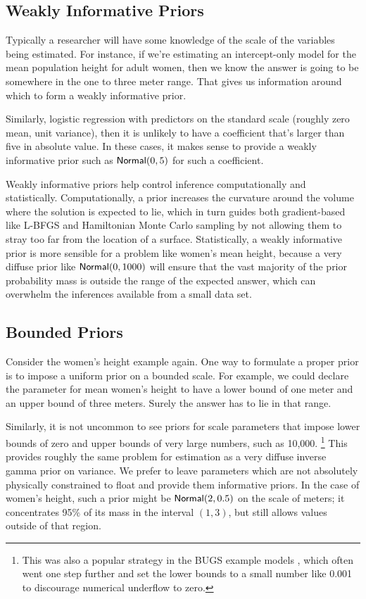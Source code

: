 \subsection{Weakly Informative Priors}

Typically a researcher will have some knowledge of the scale of the
variables being estimated.  For instance, if we're estimating an
intercept-only model for the mean population height for adult women,
then we know the answer is going to be somewhere in the one to three
meter range.  That gives us information around which to form a weakly
informative prior.

Similarly, logistic regression with predictors on the standard scale
(roughly zero mean, unit variance), then it is unlikely to have a
coefficient that's larger than five in absolute value.  In these
cases, it makes sense to provide a weakly informative prior such as
$\distro{Normal}(0,5)$ for such a coefficient.

Weakly informative priors help control inference computationally and
statistically.  Computationally, a prior increases the curvature
around the volume where the solution is expected to lie, which in turn
guides both gradient-based like L-BFGS and Hamiltonian Monte Carlo
sampling by not allowing them to stray too far from the location of a
surface.  Statistically, a weakly informative prior is more sensible
for a problem like women's mean height, because a very diffuse prior
like $\distro{Normal}(0,1000)$ will ensure that the vast majority of
the prior probability mass is outside the range of the expected
answer, which can overwhelm the inferences available from a small data
set.

\subsection{Bounded Priors}

Consider the women's height example again.  One way to formulate a
proper prior is to impose a uniform prior on a bounded scale.  For
example, we could declare the parameter for mean women's height to
have a lower bound of one meter and an upper bound of three meters.
Surely the answer has to lie in that range.  

Similarly, it is not uncommon to see priors for scale parameters that
impose lower bounds of zero and upper bounds of very large numbers,
such as 10,000.%
%
\footnote{This was also a popular strategy in the BUGS example models
  \citep{LunnEtAl:2012}, which often went one step further and set the
  lower bounds to a small number like 0.001 to discourage numerical
  underflow to zero.}
%
This provides roughly the same problem for estimation as a very
diffuse inverse gamma prior on variance.  We prefer to leave
parameters which are not absolutely physically constrained to float
and provide them informative priors.  In the case of women's height,
such a prior might be $\distro{Normal}(2,0.5)$ on the scale of meters;
it concentrates 95\% of its mass in the interval $(1,3)$, but still
allows values outside of that region.

